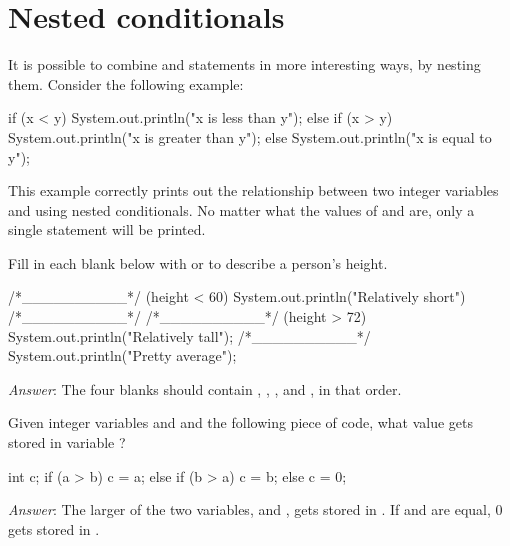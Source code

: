 \section{Nested conditionals}
It is possible to combine  and  statements in more interesting ways, by nesting them. Consider the following example:

\begin{code}
if (x < y) {
    System.out.println("x is less than y");
} else {
    if (x > y) {
        System.out.println("x is greater than y");
    } else {
        System.out.println("x is equal to y");
    }
}
\end{code}

\noindent This example correctly prints out the relationship between two integer variables  and  using nested conditionals. No matter what the values of  and  are, only a single statement will be printed. 

\begin{example}
Fill in each blank below with  or  to describe a person's height.

\begin{code}
/*__________*/ (height < 60) {
    System.out.println("Relatively short")
} /*__________*/ {
    /*__________*/ (height > 72) {
        System.out.println("Relatively tall");
    } /*__________*/ {
        System.out.println("Pretty average");
    }
}
\end{code}

\emph{Answer}: The four blanks should contain , , , and , in that order.
\end{example}

\begin{example}
Given integer variables  and  and the following piece of code, what value gets stored in variable ?

\begin{code}
int c;
if (a > b) {
    c = a;
} else {
    if (b > a) {
        c = b;
    } else {
        c = 0;
    }
}
\end{code}

\emph{Answer}: The larger of the two variables,  and , gets stored in . If  and  are equal, 0 gets stored in .
\end{example}

